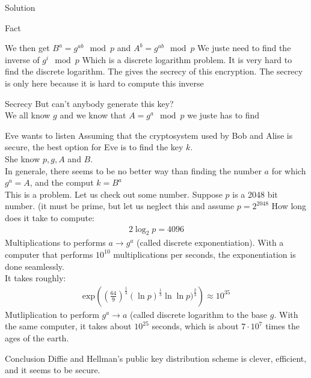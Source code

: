 \begin{parag}{Solution}
\begin{subparag}{Fact}
\begin{theoreme}
    \end{theoreme}
    We then get $B^a = g^{ab} \mod p$ and $A^b = g^{ab} \mod p$ We juste need to find the inverse of $g^i \mod p$ Which is a discrete logarithm problem. It is very hard to find the discrete logarithm. The gives the secrecy of this encryption. The secrecy is only here because it is hard to compute this inverse

\end{subparag}
\begin{subparag}{Secrecy}
    But can't anybody generate this key?\\
    We all know $g$ and we know that $A = g^a \mod p$ we juste has to find
    
\end{subparag}
\begin{subparag}{Eve wants to listen}
    Assuming that the cryptosystem used by Bob and Alise is secure, the best option for Eve is to find the key $k$. \\
    She know $p, g, A$ and $B$.\\
    In generale, there seems to be no better way than finding the number $a$ for which $g^a = A$, and the comput $k = B^a$\\
    This is a problem. Let us check out some number. Suppose $p$ is a 2048 bit number. (it must be prime, but let us neglect this and assume $p  = 2^{2048}$ How long does it take to compute:
    \begin{align*}
        2\log_2 p = 4096
    \end{align*}
    Multiplications to performs $a \to g^a$ (called discrete exponentiation). With a computer that performs $10^{10}$ multiplications per seconds, the exponentiation is done seamlessly.\\
    It takes roughly:
    \begin{align*}
        \text{exp} \left( \left( \frac{64}{9} \right)^{ \frac{1}{3}} (\ln p)^{ \frac{1}{3}} \ln \ln p)^{ \frac{2}{3}} \right) \approx 10^{35}
    \end{align*}
    Mutliplication to perform $g^a \to a$ (called discrete logarithm to the base $g$. With the same computer, it takes about $10^{25}$ seconds, which is about $7 \cdot 10^{7}$ times the ages of the earth.
\end{subparag}
\begin{subparag}{Conclusion}
    Diffie and Hellman's public key distribution scheme is clever, efficient, and it seems to be secure.
\end{subparag}
\end{parag}

